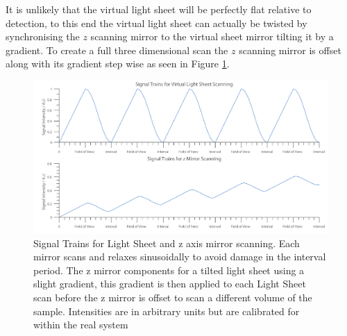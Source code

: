 It is unlikely that the virtual light sheet will be perfectly flat relative to detection, to this end the virtual light sheet can actually be twisted by synchronising the $z$ scanning mirror to the virtual sheet mirror tilting it by a gradient.
To create a full three dimensional scan the $z$ scanning mirror is offset along with its gradient step wise as seen in Figure \ref{fig:Signals}.

\begin{figure}
\centering
\includegraphics[width=\linewidth]{Figures/Signals}
\caption[Light Sheet Signal Trains]{Signal Trains for Light Sheet and z axis mirror scanning.
Each mirror scans and relaxes sinusoidally to avoid damage in the interval period.
The z mirror components for a tilted light sheet using a slight gradient, this gradient is then applied to each Light Sheet scan before the z mirror is offset to scan a different volume of the sample.
Intensities are in arbitrary units but are calibrated for within the real system}
\label{fig:Signals}
\end{figure}


%
%

